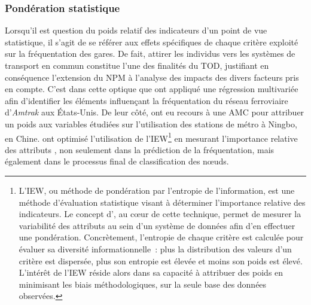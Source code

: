 \begin{refsegment}
\subsubsection*{Pondération statistique
    \label{chap6:ponderation-objective}
    }

Lorsqu'il est question du poids relatif des indicateurs d'un point de vue statistique, il s'agit de se référer aux effets spécifiques de chaque critère exploité sur la fréquentation des gares. De fait, attirer les individus vers les systèmes de transport en commun constitue l'une des finalités du \acrshort{TOD}, justifiant en conséquence l'extension du \acrshort{NPM} à l'analyse des impacts des divers facteurs pris en compte. C'est dans cette optique que \textcolor{blue}{\textcite[2]{cummings_does_2022}} ont appliqué une régression multivariée afin d’identifier les éléments influençant la fréquentation du réseau ferroviaire d'\textsl{Amtrak} aux États-Unis. De leur côté, \textcolor{blue}{\textcite[248]{yang_tod_2021}} ont eu recours à une \acrfull{AMC} pour attribuer un poids aux variables étudiées sur l'utilisation des stations de métro à Ningbo, en Chine. \textcolor{blue}{\textcite[4]{amini_pishro_integrated_2023}} ont optimisé l'utilisation de l'\acrfull{IEW}\footnote{
    L'\acrfull{IEW}, ou méthode de pondération par l'entropie de l'information, est une méthode d'évaluation statistique visant à déterminer l'importance relative des indicateurs. Le concept d', au cœur de cette technique, permet de mesurer la variabilité des attributs au sein d'un système de données afin d'en effectuer une pondération. Concrètement, l'entropie de chaque critère est calculée pour évaluer sa diversité informationnelle~: plus la distribution des valeurs d'un critère est dispersée, plus son entropie est élevée et moins son poids est élevé. L'intérêt de l'\acrshort{IEW} réside alors dans sa capacité à attribuer des poids en minimisant les biais méthodologiques, sur la seule base des données observées.
} en mesurant l'importance relative des attributs \textcolor{blue}{\autocite[4]{shannon_mathematical_1948}}, non seulement dans la prédiction de la fréquentation, mais également dans le processus final de classification des nœuds.%


\end{refsegment}
